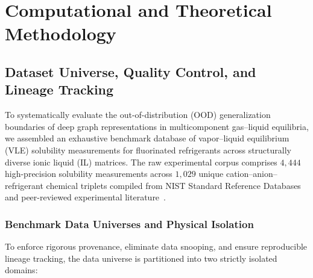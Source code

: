 \section{Computational and Theoretical Methodology}
\label{sec:methods}

\subsection{Dataset Universe, Quality Control, and Lineage Tracking}
\label{subsec:dataset_provenance}

To systematically evaluate the out-of-distribution (OOD) generalization boundaries of deep graph representations in multicomponent gas--liquid equilibria, we assembled an exhaustive benchmark database of vapor--liquid equilibrium (VLE) solubility measurements for fluorinated refrigerants across structurally diverse ionic liquid (IL) matrices. The raw experimental corpus comprises $4,444$ high-precision solubility measurements across $1,029$ unique cation--anion--refrigerant chemical triplets compiled from NIST Standard Reference Databases and peer-reviewed experimental literature~\cite{Sarmiento2021_Consistency}.

\subsubsection{Benchmark Data Universes and Physical Isolation}
To enforce rigorous provenance, eliminate data snooping, and ensure reproducible lineage tracking, the data universe is partitioned into two strictly isolated domains:

